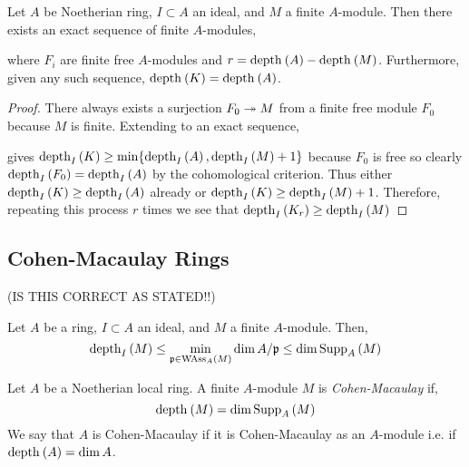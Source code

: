 \documentclass[12pt]{article}
\begin{document}
\begin{prop}
Let $A$ be Noetherian ring, $I \subset A$ an ideal, and $M$ a finite $A$-module. Then there exists an exact sequence of finite $A$-modules,
\begin{center}
\end{center}
where $F_i$ are finite free $A$-modules and $r = \mathrm{depth}_{} \left( A \right) - \mathrm{depth}_{} \left( M \right)$. Furthermore, given any such sequence, $\mathrm{depth}_{} \left( K \right) = \mathrm{depth}_{} \left( A \right)$. 
\end{prop}

\begin{proof}
There always exists a surjection $F_0 \twoheadrightarrow M$ from a finite free module $F_0$ because $M$ is finite. Extending to an exact sequence,
\begin{center}
\end{center}
gives $\mathrm{depth}_{I} \left( K \right) \ge \min\{ \mathrm{depth}_{I} \left( A \right), \mathrm{depth}_{I} \left( M \right)  + 1\}$ because $F_0$ is free so clearly $\mathrm{depth}_{I} \left( F_0 \right) = \mathrm{depth}_{I} \left( A \right)$ by the cohomological criterion. Thus either $\mathrm{depth}_{I} \left( K \right) \ge \mathrm{depth}_{I} \left( A \right)$ already or  $\mathrm{depth}_{I} \left( K \right) \ge \mathrm{depth}_{I} \left( M \right) + 1$. Therefore, repeating this process $r$ times we see that $\mathrm{depth}_{I} \left( K_r \right) \ge \mathrm{depth}_{I} \left( M \right)$
\end{proof}

\subsection{Cohen-Macaulay Rings}


(IS THIS CORRECT AS STATED!!)
\begin{prop}
Let $A$ be a ring, $I \subset A$ an ideal, and $M$ a finite $A$-module. Then,
\[ \mathrm{depth}_{I} \left( M \right) \le \min_{\mathfrak{p} \in \mathrm{WAss}_{A}\left(M \right)} \dim{A/\mathfrak{p}} \le \dim{\mathrm{Supp}_{A}\left(M \right)} \] 
\end{prop}

\begin{defn}
Let $A$ be a Noetherian local ring. A finite $A$-module $M$ is \textit{Cohen-Macaulay} if,
\[ \mathrm{depth}_{} \left( M \right) = \dim{\mathrm{Supp}_{A}\left(M \right)} \]
We say that $A$ is Cohen-Macaulay if it is Cohen-Macaulay as an $A$-module i.e. if $\mathrm{depth}_{} \left( A \right) = \dim{A}$.
\end{defn}
\end{document}
